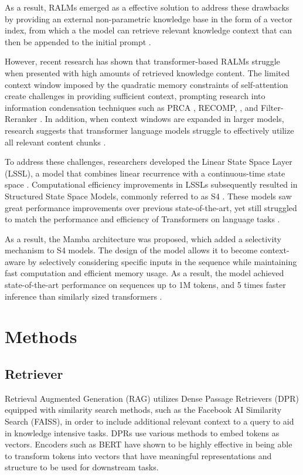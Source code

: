 \documentclass[11pt]{article}
\begin{document}
As a result, RALMs emerged as a effective solution to address these drawbacks by providing an external non-parametric knowledge base in the form of a vector index, from which a the model can retrieve relevant knowledge context that can then be appended to the initial prompt \cite{lewis2021retrievalaugmented}.

However, recent research has shown that transformer-based RALMs struggle when presented with high amounts of retrieved knowledge content. The limited context window imposed by the quadratic memory constraints of self-attention create challenges in providing sufficient context, prompting research into information condensation techniques such as PRCA \cite{yang-etal-2023-prca}, RECOMP, \cite{xu2023recomp}, and Filter-Reranker \cite {ma2023large}. In addition, when context windows are expanded in larger models, research suggests that transformer language models struggle to effectively utilize all relevant content chunks \cite{xu2024retrieval, liu2023lost}. 

To address these challenges, researchers developed the Linear State Space Layer (LSSL), a model that combines linear recurrence with a continuous-time state space \cite{gu2021combining}. Computational efficiency improvements in LSSLs subsequently resulted in Structured State Space Models, commonly referred to as S4 \cite{gu2022}. These models saw great performance improvements over previous state-of-the-art, yet still struggled to match the performance and efficiency of Transformers on language tasks \cite{gu2023mamba}.

As a result, the Mamba architecture was proposed, which added a selectivity mechanism to S4 models. The design of the model allows it to become context-aware by selectively considering specific inputs in the sequence while maintaining fast computation and efficient memory usage. As a result, the model achieved state-of-the-art performance on sequences up to 1M tokens, and 5 times faster inference than similarly sized transformers \cite{gu2023mamba}.

\section{Methods}
\subsection{Retriever}
Retrieval Augmented Generation (RAG) utilizes Dense Passage Retrievers (DPR) equipped with similarity search methods, such as the Facebook AI Similarity Search (FAISS), in order to include additional relevant context to a query to aid in knowledge intensive tasks. DPRs use various methods to embed tokens as vectors. Encoders such as BERT have shown to be highly effective in being able to transform tokens into vectors that have meaningful representations and structure to be used for downstream tasks.
\end{document}
